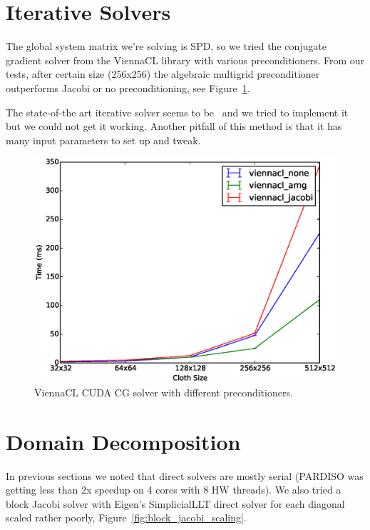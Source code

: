 \documentclass{article}
\begin{document}
\section{Iterative Solvers}
The global system matrix we're solving is SPD, so we tried the conjugate gradient
solver from the ViennaCL library with various preconditioners. From our tests,
after certain size (256x256) the algebraic multigrid preconditioner outperforms Jacobi
or no preconditioning, see Figure~\ref{fig:viennacl_preconds}.

The state-of-the art iterative solver seems to be~\cite{Wang15} and we tried
to implement it but we could not get it working. Another pitfall of this method
is that it has many input parameters to set up and tweak.

\begin{figure}[htb!]
	\centering
	\includegraphics[width=0.9\linewidth]{img/viennacl_none_jacobi_amg}
	\caption{ViennaCL CUDA CG solver with different preconditioners.
	\label{fig:viennacl_preconds}}
\end{figure}

\section{Domain Decomposition}
In previous sections we noted that direct solvers are mostly serial (PARDISO
was getting less than 2x speedup on 4 cores with 8 HW threads). We also tried
a block Jacobi solver with Eigen's SimplicialLLT direct solver for each diagonal
scaled rather poorly, Figure~\ref{fig:block_jacobi_scaling}.
\end{document}
